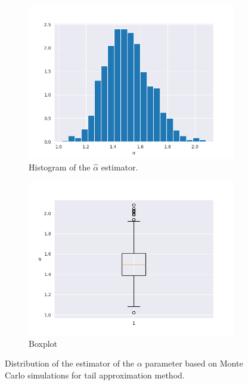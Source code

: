 \documentclass{article}
\begin{document}
		\begin{figure}[H]
			\begin{subfigure}{.5\textwidth}
				\centering
				\includegraphics[width=1\linewidth]{images/cdf_alpha_hist.png}
				\caption{Histogram of the $\hat\alpha$ estimator.				}
			\end{subfigure}
			\begin{subfigure}[r]{.5\textwidth}
				\centering
				\includegraphics[width=1\linewidth]{images/cdf_alpha_boxplot.png}
				\caption{Boxplot}
			\end{subfigure}
			\caption{Distribution of the estimator of the $\alpha$ parameter based on Monte Carlo simulations for tail approximation method.}\label{alpha1}
		\end{figure}
	
\end{document}
